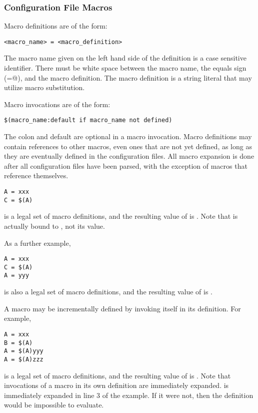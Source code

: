 \subsubsection{\label{sec:Config-File-Macros}Configuration File Macros} 


Macro definitions are of the form:
\begin{verbatim}
<macro_name> = <macro_definition>
\end{verbatim}

The macro name given on the left hand side of the definition is
a case sensitive identifier.
There must be white space between the macro name, the
equals sign (\verb@=@), and the macro definition.
The macro definition is a string literal that may utilize macro substitution.

Macro invocations are of the form: 
\begin{verbatim}
$(macro_name:default if macro_name not defined)
\end{verbatim}

The colon and default are optional in a macro invocation.
Macro definitions may contain references to other macros, even ones
that are not yet defined, as long as they are eventually defined in
the configuration files.
All macro expansion is done after all configuration files have been parsed,
with the exception of macros that reference themselves.

\begin{verbatim}
A = xxx
C = $(A) 
\end{verbatim}
is a legal set of macro definitions, and the resulting value of 
 is
.
Note that
 is actually bound to 
, not its value.

As a further example,
\begin{verbatim}
A = xxx
C = $(A)
A = yyy
\end{verbatim}
is also a legal set of macro definitions, and the resulting value of
 is .  

A macro may be incrementally defined by invoking itself in its
definition.  For example,
\begin{verbatim}
A = xxx
B = $(A)
A = $(A)yyy
A = $(A)zzz
\end{verbatim}
is a legal set of macro definitions, and the resulting value of 
is .
Note that invocations of a macro in
its own definition are immediately
expanded.
 is immediately expanded in line 3 of the example.
If it were not, then the definition would be impossible to
evaluate.

